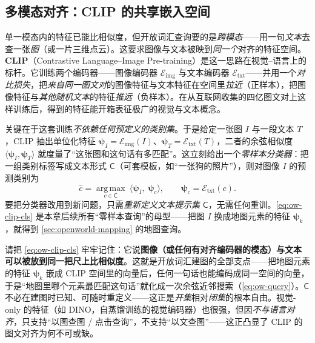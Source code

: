 \subsection{多模态对齐：CLIP 的共享嵌入空间}
\label{sec:openworld-clip}

单一模态内的特征已能比相似度，但开放词汇查询要的是\emph{跨模态}——用一句\emph{文本}去查一张\emph{图}（或一片三维点云）。这要求图像与文本被映到\emph{同一个}对齐的特征空间。\textbf{CLIP}（Contrastive Language--Image Pre-training）是这一思路在视觉–语言上的标杆\cite{radford2021clip}。它训练两个编码器——图像编码器 $\mathcal{E}_{\mathrm{img}}$ 与文本编码器 $\mathcal{E}_{\mathrm{txt}}$——并用一个\emph{对比损失}，把\emph{来自同一图文对}的图像特征与文本特征在空间里\emph{拉近}（正样本），把图像特征与\emph{其他随机文本}的特征\emph{推远}（负样本）。在从互联网收集的四亿图文对上这样训练后，得到的特征能开箱表征极广的视觉与文本概念\cite{radford2021clip}。

关键在于这套训练\emph{不依赖任何预定义的类别集}。于是给定一张图 $I$ 与一段文本 $T$，CLIP 抽出单位化特征 $\boldsymbol\psi_I=\mathcal{E}_{\mathrm{img}}(I)$、$\boldsymbol\psi_T=\mathcal{E}_{\mathrm{txt}}(T)$，二者的余弦相似度 $\langle\boldsymbol\psi_I,\boldsymbol\psi_T\rangle$ 就度量了“这张图和这句话有多匹配”。这立刻给出一个\emph{零样本分类器}：把一组类别标签写成文本形式 $\mathsf{C}$（可套模板，如“一张{狗}的照片”），则对图像 $I$ 的预测类别为
\begin{equation}
  \hat{c}=\operatorname*{arg\,max}_{c\in\mathsf{C}}\ \langle\boldsymbol\psi_I,\ \boldsymbol\psi_c\rangle,\qquad \boldsymbol\psi_c=\mathcal{E}_{\mathrm{txt}}(c).
  \label{eq:ow-clip-cls}
\end{equation}
要把分类器改用到新问题，只需\emph{重新定义文本提示集} $\mathsf{C}$，无需任何重训。\cref{eq:ow-clip-cls} 是本章后续所有“零样本查询”的母型——把图 $I$ 换成地图元素的特征 $\boldsymbol\psi_k$，就得到 \cref{sec:openworld-mapping} 的地图查询。

\begin{insight}
请把 \cref{eq:ow-clip-cls} 牢牢记住：它说\textbf{图像（或任何有对齐编码器的模态）与文本可以被放到同一把尺上比相似度}。这就是开放词汇建图的全部支点——把地图元素的特征 $\boldsymbol\psi_k$ 嵌成 CLIP 空间里的向量后，任何一句话也能编码成同一空间的向量，于是“地图里哪个元素最匹配这句话”就化成一次余弦近邻搜索（\cref{eq:ow-query}）。$\mathsf{C}$ 不必在建图时已知、可随时重定义——这正是\emph{开集}相对\emph{闭集}的根本自由。视觉-only 的特征（如 DINO，自蒸馏训练的视觉编码器）也很强，但因\emph{不与语言对齐}，只支持“以图查图 / 点击查询”，不支持“以文查图”——这正凸显了 CLIP 的图文对齐为何不可或缺。
\end{insight}


